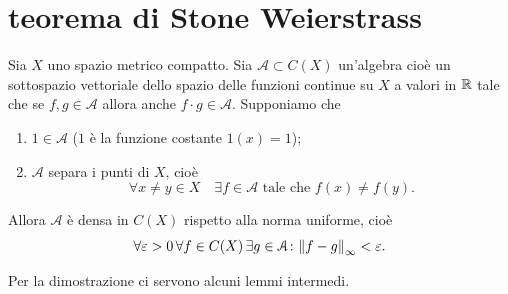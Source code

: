 \section{teorema di Stone Weierstrass}

\begin{theorem}
  \label{th:stone-weierstrass}
Sia $X$ uno spazio metrico compatto.
Sia ${\mathcal A} \subset C(X)$ un'algebra 
cioè un sottospazio vettoriale dello spazio delle funzioni continue 
su $X$ a valori in ${\mathbb R}$
tale che se $f,g\in {\mathcal A}$ allora anche $f\cdot g\in {\mathcal A}$.
Supponiamo che
\begin{enumerate}
\item $1 \in {\mathcal A}$ ($1$ è la funzione costante $1(x)=1$);
\item ${\mathcal A}$ separa i punti di $X$, cioè
\[
\forall x \neq y \in X \quad \exists f \in {\mathcal A} \text{ tale che } f(x)\neq f(y).
\]
\end{enumerate}

Allora ${\mathcal A}$ è densa in $C(X)$ rispetto alla norma uniforme,
cioè 
\[
\forall \varepsilon>0\, \forall f\in C(X)\,\exists g\in {\mathcal A}\colon {\left\Vert f-g\right\Vert}_\infty < \varepsilon.
\]
\end{theorem}

Per la dimostrazione ci servono alcuni lemmi intermedi.

